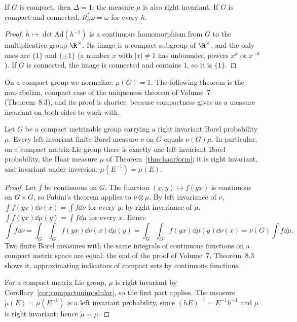 \begin{corollary}\label{cor:compactunimodular}
If $G$ is compact, then $\Delta=1$: the measure $\mu$ is also right invariant. If $G$ is compact and connected, $R_h^*\omega=\omega$ for every $h$.
\end{corollary}

\begin{proof}
$h\mapsto\det\mathrm{Ad}(h^{-1})$ is a continuous homomorphism from $G$ to the multiplicative group $\R^\times$. Its image is a compact subgroup of $\R^\times$, and the only ones are $\{1\}$ and $\{\pm1\}$
(a number $x$ with $|x|\neq1$ has unbounded powers $x^k$ or $x^{-k}$). If $G$ is connected, the image is connected and contains $1$, so it is $\{1\}$.
\end{proof}

On a compact group we normalize: $\mu(G)=1$. The following theorem is the non-abelian, compact case of the uniqueness theorem of Volume~7 (Theorem~8.3), and its
proof is shorter, because compactness gives us a measure invariant on both sides to work with.

\begin{theorem}[uniqueness]\label{thm:haarcompact}
Let $G$ be a compact metrizable group carrying a right invariant Borel probability $\mu$. Every left invariant finite Borel measure $\nu$ on $G$ equals $\nu(G)\mu$.
In particular, on a compact matrix Lie group there is exactly one left invariant Borel probability, the Haar measure $\mu$ of Theorem~\ref{thm:haarform}; it is right
invariant, and invariant under inversion: $\mu(E^{-1})=\mu(E)$.
\end{theorem}

\begin{proof}
Let $f$ be continuous on $G$. The function $(x,y)\mapsto f(yx)$ is continuous on $G\times G$, so Fubini's theorem applies to $\nu\otimes\mu$. By left invariance of $\nu$,
$\int f(yx)\dd\nu(x)=\int f\dd\nu$ for every $y$; by right invariance of $\mu$, $\int f(yx)\dd\mu(y)=\int f\dd\mu$ for every $x$. Hence
\[\int f\dd\nu=\int_G\!\int_Gf(yx)\dd\nu(x)\dd\mu(y)=\int_G\!\int_Gf(yx)\dd\mu(y)\dd\nu(x)=\nu(G)\int f\dd\mu.\]
Two finite Borel measures with the same integrals of continuous functions on a compact metric space are equal: the end of the proof of Volume~7, Theorem~8.3
shows it, approximating indicators of compact sets by continuous functions.

For a compact matrix Lie group, $\mu$ is right invariant by Corollary~\ref{cor:compactunimodular}, so the first part applies. The measure $\check\mu(E)=\mu(E^{-1})$ is a left invariant
probability, since $(hE)^{-1}=E^{-1}h^{-1}$ and $\mu$ is right invariant; hence $\check\mu=\mu$.
\end{proof}

